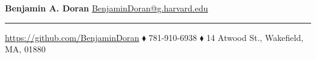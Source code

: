 \documentclass[hidelinks, 11pt]{article}
\begin{document}
\newcommand{\sectiontext}[1]{\bf\color{sectioncolor}#1}
\newcommand{\titletext}[1]{{\large\bf #1}}
\newcommand{\experiencetitle}[4]{
\titletext{#1}, {#2}  \hspace*{\fill} \emph{#3} \\ 
\emph{#4}\vspace{-6pt}
}

\begin{center}
{\huge\bf Benjamin A. Doran} \hspace*{\fill}  
{\color{blue} \href{mailto://BenjaminDoran@g.harvard.edu}{\large BenjaminDoran@g.harvard.edu}}
\hrule
\vspace{6pt}
{\color{blue}\url{https://github.com/BenjaminDoran}} $\blacklozenge$ 781-910-6938 $\blacklozenge$ 14 Atwood St., Wakefield, MA, 01880
\end{center}
\vspace{-6pt}


\end{document}
